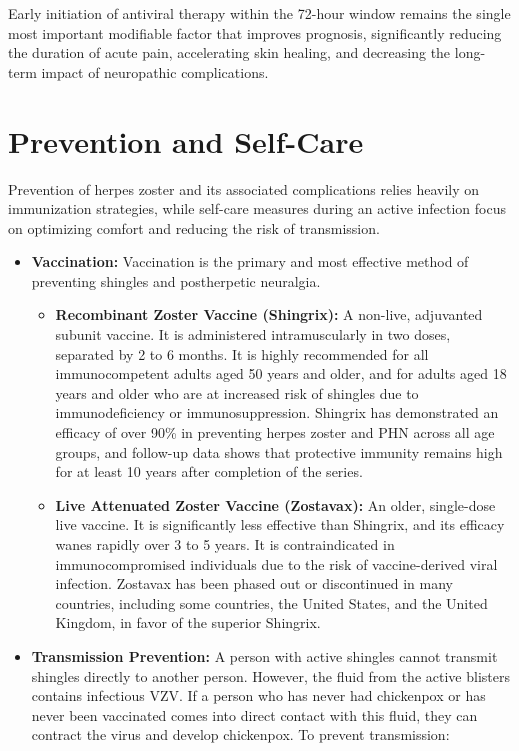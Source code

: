 Early initiation of antiviral therapy within the 72-hour window remains the single most important modifiable factor that improves prognosis, significantly reducing the duration of acute pain, accelerating skin healing, and decreasing the long-term impact of neuropathic complications.

\section*{Prevention and Self-Care}
Prevention of herpes zoster and its associated complications relies heavily on immunization strategies, while self-care measures during an active infection focus on optimizing comfort and reducing the risk of transmission.

\begin{itemize}
    \item \textbf{Vaccination:} Vaccination is the primary and most effective method of preventing shingles and postherpetic neuralgia.
    \begin{itemize}
        \item \textbf{Recombinant Zoster Vaccine (Shingrix):} A non-live, adjuvanted subunit vaccine. It is administered intramuscularly in two doses, separated by 2 to 6 months. It is highly recommended for all immunocompetent adults aged 50 years and older, and for adults aged 18 years and older who are at increased risk of shingles due to immunodeficiency or immunosuppression. Shingrix has demonstrated an efficacy of over 90\% in preventing herpes zoster and PHN across all age groups, and follow-up data shows that protective immunity remains high for at least 10 years after completion of the series.
        \item \textbf{Live Attenuated Zoster Vaccine (Zostavax):} An older, single-dose live vaccine. It is significantly less effective than Shingrix, and its efficacy wanes rapidly over 3 to 5 years. It is contraindicated in immunocompromised individuals due to the risk of vaccine-derived viral infection. Zostavax has been phased out or discontinued in many countries, including some countries, the United States, and the United Kingdom, in favor of the superior Shingrix.
    \end{itemize}
    \item \textbf{Transmission Prevention:} A person with active shingles cannot transmit shingles directly to another person. However, the fluid from the active blisters contains infectious VZV. If a person who has never had chickenpox or has never been vaccinated comes into direct contact with this fluid, they can contract the virus and develop chickenpox. To prevent transmission:

\end{itemize}
